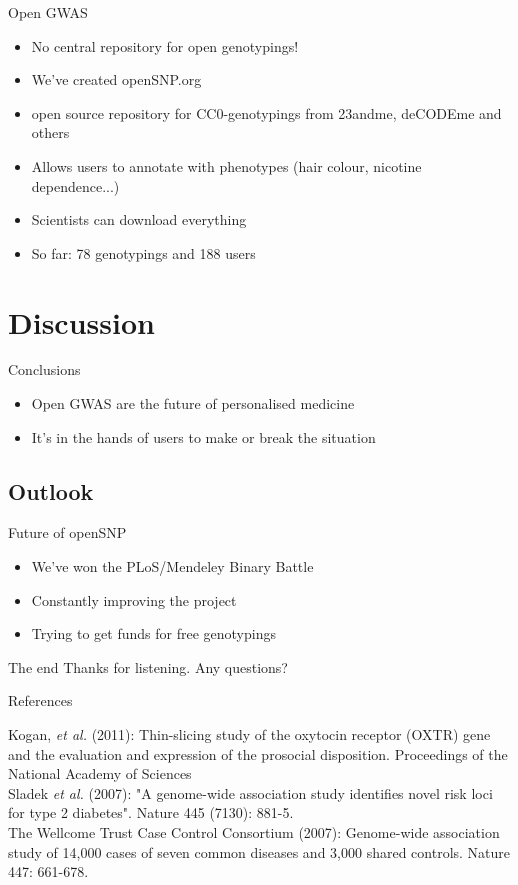 \documentclass[12pt,a4paper]{beamer}
\begin{document}
\begin{frame}{Open GWAS}
\begin{itemize}
\item No central repository for open genotypings!
\pause \item We've created openSNP.org
\pause \item open source repository for CC0-genotypings from 23andme, deCODEme and others
\pause \item Allows users to annotate with phenotypes (hair colour, nicotine dependence...)
\pause \item Scientists can download everything
\pause \item So far: 78 genotypings and 188 users
\end{itemize}
\end{frame}

\section{Discussion}
\begin{frame}{Conclusions}
\begin{itemize}
\item Open GWAS are the future of personalised medicine
\pause \item It's in the hands of users to make or break the situation
\end{itemize}
\end{frame}

\subsection{Outlook}
\begin{frame}{Future of openSNP}
\begin{itemize}
\item We've won the PLoS/Mendeley Binary Battle
\pause \item Constantly improving the project
\pause \item Trying to get funds for free genotypings
\end{itemize}
\end{frame}

\begin{frame}{The end}
Thanks for listening. Any questions?
\end{frame}


\begin{frame}{References}
\begin{tiny}
Kogan, \textit{et al.} (2011): Thin-slicing study of the oxytocin receptor (OXTR) gene and the evaluation and expression of the prosocial disposition. Proceedings of the National Academy of Sciences\\
Sladek \textit{et al.} (2007): "A genome-wide association study identifies novel risk loci for type 2 diabetes". Nature 445 (7130): 881-5. \\
The Wellcome Trust Case Control Consortium  (2007): Genome-wide association study of 14,000 cases of seven common diseases and 3,000 shared controls. Nature 447: 661-678.\\
\end{tiny}
\end{frame}
\end{document}
